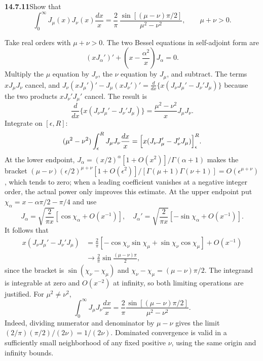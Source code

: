 \par\bigskip
\noindent\textbf{14.7.11}\quad Show that
\[
\int_{0}^{\infty}J_{\mu}(x)J_{\nu}(x)\frac{dx}{x}
=\frac{2}{\pi}\,\frac{\sin[(\mu-\nu)\pi/2]}{\mu^{2}-\nu^{2}},
\qquad\mu+\nu>0.
\]
\par{}
\solution
Take real orders with $\mu+\nu>0$. The two Bessel
equations in self-adjoint form are
\[
(xJ_\alpha')'+\left(x-\frac{\alpha^2}{x}\right)J_\alpha=0.
\]
Multiply the $\mu$ equation by $J_\nu$, the $\nu$ equation by
$J_\mu$, and subtract. The terms $xJ_\mu J_\nu$ cancel, and
$J_\nu(xJ_\mu')'-J_\mu(xJ_\nu')'
=\frac d{dx}\{x(J_\nu J_\mu'-J_\nu'J_\mu)\}$ because the two
products $xJ_\nu'J_\mu'$ cancel. The result is
\[
\frac d{dx}\{x(J_\nu J_\mu'-J_\nu'J_\mu)\}
=\frac{\mu^2-\nu^2}{x}J_\mu J_\nu.
\]
Integrate on $[\epsilon,R]$:
\[
(\mu^2-\nu^2)\int_\epsilon^RJ_\mu J_\nu\frac{dx}x
=\Bigl[x(J_\nu J_\mu'-J_\nu'J_\mu)\Bigr]_\epsilon^R.
\]
At the lower endpoint, $J_\alpha=(x/2)^\alpha[1+O(x^2)]/\Gamma(\alpha+1)$
makes the bracket
$(\mu-\nu)(\epsilon/2)^{\mu+\nu}[1+O(\epsilon^2)]/
[\Gamma(\mu+1)\Gamma(\nu+1)]=O(\epsilon^{\mu+\nu})$,
which tends to zero; when a leading
coefficient vanishes at a negative integer order, the actual
power only improves this estimate. At the upper endpoint put
$\chi_\alpha=x-\alpha\pi/2-\pi/4$ and use
\[
J_\alpha=\sqrt{\frac2{\pi x}}[\cos\chi_\alpha+O(x^{-1})],\quad
J_\alpha'=\sqrt{\frac2{\pi x}}[-\sin\chi_\alpha+O(x^{-1})].
\]
It follows that
\begin{align*}
x(J_\nu J_\mu'-J_\nu'J_\mu)
&=\frac2\pi[-\cos\chi_\nu\sin\chi_\mu
+\sin\chi_\nu\cos\chi_\mu]+O(x^{-1})\\
&\longrightarrow\frac2\pi\sin\frac{(\mu-\nu)\pi}{2},
\end{align*}
since the bracket is $\sin(\chi_\nu-\chi_\mu)$ and
$\chi_\nu-\chi_\mu=(\mu-\nu)\pi/2$.
The integrand is integrable at zero and $O(x^{-2})$ at infinity,
so both limiting operations are justified. For $\mu^2\ne\nu^2$,
\[
\boxed{\int_0^\infty J_\mu J_\nu\frac{dx}{x}
=\frac2\pi\frac{\sin[(\mu-\nu)\pi/2]}{\mu^2-\nu^2}.}
\]
 Indeed, dividing numerator and
denominator by $\mu-\nu$ gives the limit
$(2/\pi)(\pi/2)/(2\nu)=1/(2\nu)$. Dominated convergence
is valid in a sufficiently small neighborhood of any fixed
positive $\nu$, using the same origin and infinity bounds.

